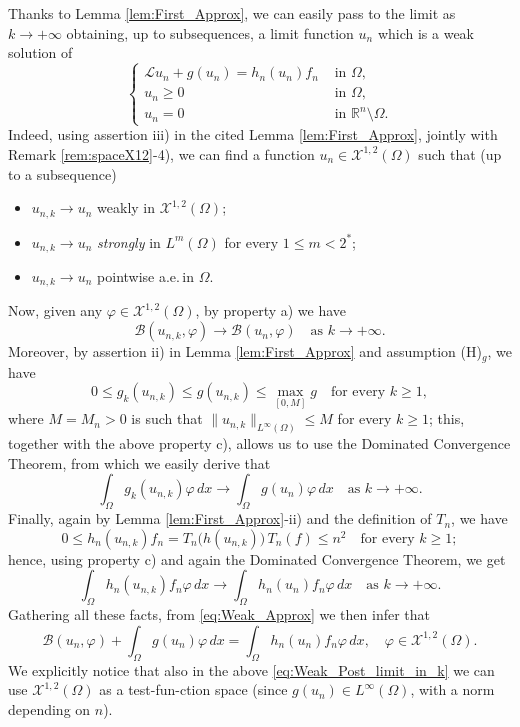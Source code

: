 \documentclass[11pt,a4paper]{amsart}
\theoremstyle{definition}
\theoremstyle{plain}
\numberwithin{equation}{section}
\begin{document}
{ Thanks to Lemma \ref{lem:First_Approx}, we can easily 
 pass to the limit as $k\to +\infty$ obtaining, up to subsequences, a limit function $u_n$ which is a weak solution of
\begin{equation}\label{eq:Post_limit_in_k}
\left\{ \begin{array}{rl}
\mathcal{L}u_n + g(u_n) = h_{n}(u_n)f_n &\textrm{ in } \Omega,\\
u_n \geq 0 & \textrm{ in } \Omega,\\
u_n = 0 & \textrm{ in } \mathbb{R}^{n}\setminus \Omega.
\end{array}\right.
\end{equation}
Indeed, using assertion iii) in the cited Lemma \ref{lem:First_Approx},
jointly with Remark \ref{rem:spaceX12}-4),
we can find a function $u_n\in \mathcal{X}^{1,2}(\Omega)$ such that
(up to a subsequence)
\begin{itemize}
    \item[a)] $u_{n,k}\to u_n$ weakly in $\mathcal{X}^{1,2}(\Omega)$;
    \item[b)] $u_{n,k}\to u_n$ \emph{strongly} in $L^m(\Omega)$ for every $1\leq m < 2^\ast$;
    \item[c)] $u_{n,k}\to u_n$ pointwise a.e.\,in $\Omega$.
   \end{itemize}
Now, given any $\varphi\in \mathcal{X}^{1,2}(\Omega)$, by property a) we have
$$\mathcal{B}(u_{n,k},\varphi)\to \mathcal{B}(u_n,\varphi)\quad\text{as $k\to+\infty$}.$$
Moreover, by assertion ii) in Lemma \ref{lem:First_Approx} and
assumption (H)$_g$, we have
$$0\leq g_k(u_{n,k})\leq g(u_{n,k}) \leq \max_{[0,M]}g\quad\text{for every $k\geq 1$},$$
where $M = M_n > 0$ is such that $\|u_{n,k}\|_{L^\infty(\Omega)}\leq M$ for every $k\geq 1$; this, together with the above property c), allows us to use
the Dominated Convergence Theorem, from which we easily derive that
$$\int_{\Omega}g_k(u_{n,k})\varphi\,dx\to \int_{\Omega}g(u_n)\varphi\,dx\quad
\text{as $k\to+\infty$}.$$
Finally, again by Lemma \ref{lem:First_Approx}-ii) and the definition of $T_n$, we have
$$0\leq h_n(u_{n,k})f_n = T_n\big(h(u_{n,k})\big)\,T_n(f)\leq n^2\quad\text{for every $k\geq 1$};$$
hence, using property c) and again the Dominated Convergence Theorem, we get
$$\int_{\Omega}h_n(u_{n,k})f_n\varphi\,dx\to \int_{\Omega}h_n(u_{n})f_n\varphi\,dx\quad
\text{as $k\to+\infty$}.$$
Gathering all these facts, from \eqref{eq:Weak_Approx} we then infer that
\begin{equation}\label{eq:Weak_Post_limit_in_k}
\mathcal{B}(u_n,\varphi) + \int_{\Omega}g(u_n)\varphi\,dx = \int_{\Omega}h_n(u_n)f_n \varphi\,dx, \quad \varphi \in \mathcal{X}^{1,2}(\Omega).
\end{equation}
We explicitly notice that also in the above \eqref{eq:Weak_Post_limit_in_k}
we can use $\mathcal{X}^{1,2}(\Omega)$ as a test-fun-ction
space (since $g(u_n)\in L^\infty(\Omega)$, with a norm depending on $n$).
\vspace{0.1cm}

}
\end{document}
